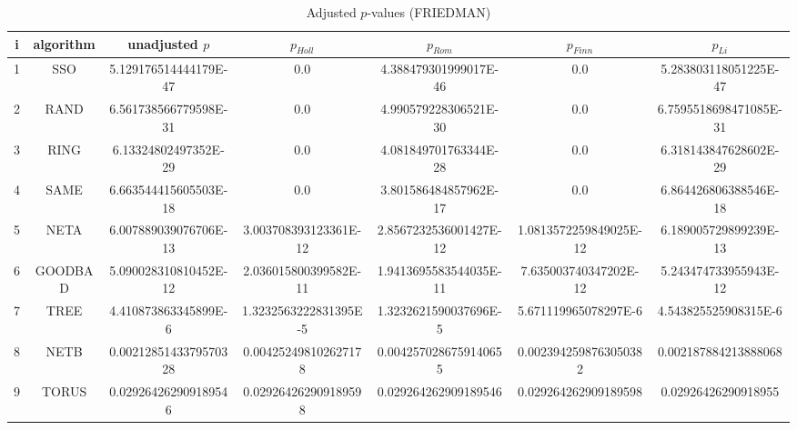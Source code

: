 \documentclass[a4paper,10pt]{article}
\begin{document}
\begin{landscape}
\begin{table}[!htp]
\centering\scriptsize
\caption{Adjusted $p$-values (FRIEDMAN)}
\begin{tabular}{ccccccc}
i&algorithm&unadjusted $p$&$p_{Holl}$&$p_{Rom}$&$p_{Finn}$&$p_{Li}$\\
\hline
1& SSO&5.129176514444179E-47&0.0&4.388479301999017E-46&0.0&5.283803118051225E-47\\
2& RAND&6.561738566779598E-31&0.0&4.990579228306521E-30&0.0&6.7595518698471085E-31\\
3& RING&6.13324802497352E-29&0.0&4.081849701763344E-28&0.0&6.318143847628602E-29\\
4& SAME&6.663544415605503E-18&0.0&3.801586484857962E-17&0.0&6.864426806388546E-18\\
5& NETA&6.007889039076706E-13&3.003708393123361E-12&2.8567232536001427E-12&1.0813572259849025E-12&6.189005729899239E-13\\
6& GOODBAD&5.090028310810452E-12&2.036015800399582E-11&1.9413695583544035E-11&7.635003740347202E-12&5.243474733955943E-12\\
7& TREE&4.410873863345899E-6&1.3232563222831395E-5&1.3232621590037696E-5&5.671119965078297E-6&4.543825525908315E-6\\
8& NETB&0.0021285143379570328&0.004252498102627178&0.0042570286759140655&0.0023942598763050382&0.002187884213888068\\
9& TORUS&0.029264262909189546&0.029264262909189598&0.029264262909189546&0.029264262909189598&0.02926426290918955\\
\hline
\end{tabular}
\end{table}


\newpage


\end{landscape}
\end{document}
